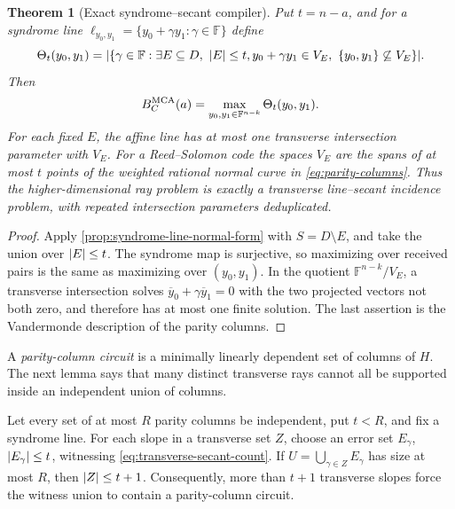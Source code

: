 \documentclass[11pt,a4paper]{amsart}
\numberwithin{equation}{section}
\newtheorem{theorem}{Theorem}[section]
\theoremstyle{remark}
\newcommand{\F}{\mathbb F}\newcommand{\B}{\mathbb B}\newcommand{\K}{\mathbb K}\newcommand{\Z}{\mathbb Z}
\begin{document}
\begin{theorem}[Exact syndrome--secant compiler]
\label{thm:syndrome-secant-exact}
Put \(t=n-a\), and for a syndrome line
\(\ell_{y_0,y_1}=\{y_0+\gamma y_1:\gamma\in\F\}\) define
\begin{equation}
 \Theta_t(y_0,y_1)=
 \abs{\{\gamma\in\F:\exists E\subseteq D,\ \abs E\le t,
 y_0+\gamma y_1\in V_E,
 \ \{y_0,y_1\}\not\subseteq V_E\}}.\label{eq:transverse-secant-count}
\end{equation}
Then
\begin{equation}
 B_C^{\rm MCA}(a)=\max_{y_0,y_1\in\F^{n-k}}
                    \Theta_t(y_0,y_1).\label{eq:exact-secant-numerator}
\end{equation}
For each fixed \(E\), the affine line has at most one transverse
intersection parameter with \(V_E\).  For a Reed--Solomon code the
spaces \(V_E\) are the spans of at most \(t\) points of the weighted
rational normal curve in \eqref{eq:parity-columns}.  Thus the
higher-dimensional ray problem is exactly a transverse line--secant
incidence problem, with repeated intersection parameters deduplicated.
\end{theorem}

\begin{proof}
Apply \cref{prop:syndrome-line-normal-form} with \(S=D\setminus E\), and
take the union over \(\lvert E\rvert\le t\).  The syndrome map is surjective, so
maximizing over received pairs is the same as maximizing over
\((y_0,y_1)\).  In the quotient \(\F^{n-k}/V_E\), a transverse
intersection solves
\(\overline y_0+\gamma\overline y_1=0\) with the two projected vectors
not both zero, and therefore has at most one finite solution.  The last
assertion is the Vandermonde description of the parity columns.
\end{proof}

A \emph{parity-column circuit} is a minimally linearly dependent set of
columns of \(H\).  The next lemma says that many distinct transverse rays
cannot all be supported inside an independent union of columns.

\begin{lemma}
\label{lem:independent-union-rays}
Let every set of at most \(R\) parity columns be independent, put
\(t<R\), and fix a syndrome line.  For each slope in a transverse set
\(Z\), choose an error set \(E_\gamma\), \(\lvert E_\gamma\rvert\le t\),
witnessing \eqref{eq:transverse-secant-count}.  If
\(U=\bigcup_{\gamma\in Z}E_\gamma\) has size at most \(R\), then
\(\lvert Z\rvert\le t+1\).  Consequently, more than \(t+1\) transverse slopes
force the witness union to contain a parity-column circuit.
\end{lemma}
\end{document}
